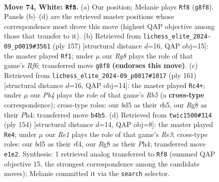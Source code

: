 \documentclass[11pt]{article}
\begin{document}
\clearpage

\begin{figure}[p]\centering
\begin{subfigure}{0.46\textwidth}\centering
\resizebox{\linewidth}{!}{%
\newchessgame
\chessboard[
  setfen={6R1/8/3k4/3b4/1P6/8/7r/3KR3 w - - 21 74},
  showmover=false,
  pgfstyle=straightmove, color=movearrow, markmove={g8-f8}
]}
\caption{}
\end{subfigure}\hfill
\begin{subfigure}{0.46\textwidth}\centering
\resizebox{\linewidth}{!}{%
\newchessgame
\chessboard[
  setfen={4k3/6R1/3K4/3B4/8/5r2/8/8 b - - 38 79},
  showmover=false,
  pgfstyle=straightmove, color=movearrow, markmove={f3-f1}
]}
\caption{}
\end{subfigure}
\\[4pt]
\begin{subfigure}{0.46\textwidth}\centering
\resizebox{\linewidth}{!}{%
\newchessgame
\chessboard[
  setfen={6R1/2K5/4rk2/7R/1r5p/8/8/8 b - - 11 81},
  showmover=false,
  pgfstyle=straightmove, color=movearrow, markmove={b4-c4}
]}
\caption{}
\end{subfigure}\hfill
\begin{subfigure}{0.46\textwidth}\centering
\resizebox{\linewidth}{!}{%
\newchessgame
\chessboard[
  setfen={8/8/8/7p/5r1P/3KR3/6k1/8 w - - 3 78},
  showmover=false,
  pgfstyle=straightmove, color=movearrow, markmove={e3-e4}
]}
\caption{}
\end{subfigure}
\caption{\textbf{Move 74, White: \texttt{Rf8}.} (a) Our position; Melanie plays \texttt{Rf8} (\texttt{g8f8}). Panels (b)--(d) are the retrieved master positions whose correspondence most drove this move (highest QAP objective among those that transfer to it). (b) Retrieved from \texttt{lichess\_elite\_2024-09\_p0019\#3561} (ply 157) [structural distance $d$=16, QAP obj=15]: the master played \texttt{Rf1}; under $\mu$ our \emph{Rg8} plays the role of that game's \emph{Rf6}; transferred move \texttt{g8f8} \textbf{(endorses this move)}. (c) Retrieved from \texttt{lichess\_elite\_2024-09\_p0017\#1017} (ply 161) [structural distance $d$=16, QAP obj=14]: the master played \texttt{Rc4+}; under $\mu$ our \emph{Pb4} plays the role of that game's \emph{Rb5} (a \textbf{cross-type} correspondence); cross-type roles: our \emph{b}d5 as their \emph{r}h5, our \emph{R}g8 as their \emph{P}h4; transferred move \texttt{b4b5}. (d) Retrieved from \texttt{twic1500\#314} (ply 154) [structural distance $d$=14, QAP obj=8]: the master played \texttt{Re4}; under $\mu$ our \emph{Re1} plays the role of that game's \emph{Re3}; cross-type roles: our \emph{b}d5 as their \emph{r}f4, our \emph{R}g8 as their \emph{P}h4; transferred move \texttt{e1e2}. Synthesis: 1 retrieved analog transferred to \texttt{Rf8} (summed QAP objective 15, the strongest correspondence among the candidate moves); Melanie committed it via the \texttt{search} selector.}
\label{fig:thought-m146}
\end{figure}
\end{document}
